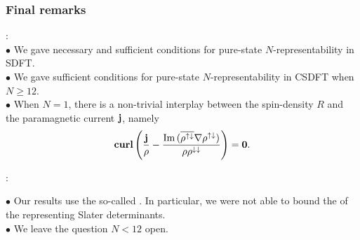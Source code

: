 \documentclass[9pt,xcolor=dvipsnames]{beamer}
\begin{document}
\begin{frame}

\frametitle{Final remarks}

: \\
 $\bullet$ We gave necessary and sufficient conditions for pure-state $N$-representability in SDFT.\\
 $\bullet$ We gave sufficient conditions for pure-state $N$-representability in CSDFT when $N \ge 12$.\\
 $\bullet$ When $N =1$, there is a non-trivial interplay between the spin-density $R$ and the paramagnetic current ${\bold j}$, namely
 \[
 	\textbf{curl} \left( \dfrac{{\bold j}}{\rho} - \dfrac{{\mathrm{Im }\, }( \overline{\rho^{{\uparrow} {\downarrow}}} {\nabla \rho^{{\uparrow} {\downarrow}}})}{\rho \rho^{{\downarrow} {\downarrow}}} \right) = {\bold 0}.
 \]

:

$\bullet$ Our results use the so-called \footnotemark. In particular, we were not able to bound the  of the representing Slater determinants. \\
$\bullet$ We leave the question $N < 12$ open.

~\\
\begin{center}
\end{center}




\end{frame}


\end{document}
